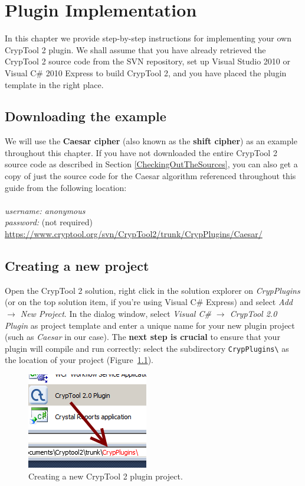 \chapter{Plugin Implementation}
\label{sec:PluginImplementation}
In this chapter we provide step-by-step instructions for implementing your own CrypTool 2 plugin. We shall assume that you have already retrieved the CrypTool 2 source code from the SVN repository, set up Visual Studio 2010 or Visual C\# 2010 Express to build CrypTool 2, and you have placed the plugin template in the right place.

\section{Downloading the example}
\label{sec:DownloadingTheExample}

We will use the \textbf{Caesar cipher} (also known as the \textbf{shift cipher}) as an example throughout this chapter. If you have not downloaded the entire CrypTool 2 source code as described in Section \ref{CheckingOutTheSources}, you can also get a copy of just the source code for the Caesar algorithm referenced throughout this guide from the following location:\\\\
\textit{username: anonymous\\
password:} (not required)\\
\url{https://www.cryptool.org/svn/CrypTool2/trunk/CrypPlugins/Caesar/}

\section{Creating a new project}
\label{sec:CreatingANewProject}

Open the CrypTool 2 solution, right click in the solution explorer on \textit{CrypPlugins} (or on the top solution item, if you're using Visual C\# Express) and select \textit{Add~$\rightarrow$ New Project}. In the dialog window, select \textit{Visual C\# $\rightarrow$ CrypTool 2.0 Plugin} as project template and enter a unique name for your new plugin project (such as \textit{Caesar} in our case). The \textbf{next step is crucial} to ensure that your plugin will compile and run correctly: select the subdirectory \texttt{CrypPlugins\textbackslash} as the location of your project (Figure~\ref{fig:vs_create_new_project}).

\begin{figure}[h!]
	\centering
		\includegraphics{figures/vs_create_new_project.png}
	\caption{Creating a new CrypTool 2 plugin project.}
	\label{fig:vs_create_new_project}
\end{figure}

